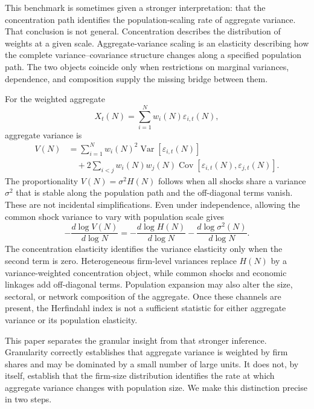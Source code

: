 \documentclass[a4paper,fleqn]{cas-dc}
\begin{document}
This benchmark is sometimes given a stronger interpretation: that the
concentration path identifies the population-scaling rate of aggregate
variance. That conclusion is not general. Concentration describes the
distribution of weights at a given scale. Aggregate-variance scaling
is an elasticity describing how the complete variance--covariance
structure changes along a specified population path. The two objects
coincide only when restrictions on marginal variances, dependence, and
composition supply the missing bridge between them.

For the weighted aggregate
\begin{equation}
    X_t(N)=\sum_{i=1}^{N}w_i(N)\varepsilon_{i,t}(N),
\end{equation}
aggregate variance is
\begin{align}
\label{eq:intro_variance}
    V(N)
    &=
    \sum_{i=1}^{N}w_i(N)^2
    \operatorname{Var}\!\left[\varepsilon_{i,t}(N)\right]
    \nonumber\\
    &\quad+
    2\sum_{i<j}w_i(N)w_j(N)
    \operatorname{Cov}\!\left[
        \varepsilon_{i,t}(N),\varepsilon_{j,t}(N)
    \right].
\end{align}
The proportionality $V(N)=\sigma^2H(N)$ follows when all shocks share a
variance $\sigma^2$ that is stable along the population path and the
off-diagonal terms vanish. These are not incidental simplifications.
Even under independence, allowing the common shock variance to vary with
population scale gives
\begin{equation}
\label{eq:benchmark_elasticity_bridge}
    -\frac{d\log V(N)}{d\log N}
    =
    -\frac{d\log H(N)}{d\log N}
    -\frac{d\log \sigma^2(N)}{d\log N}.
\end{equation}
The concentration elasticity identifies the variance elasticity only
when the second term is zero. Heterogeneous firm-level variances replace
$H(N)$ by a variance-weighted concentration object, while common shocks
and economic linkages add off-diagonal terms. Population expansion may
also alter the size, sectoral, or network composition of the aggregate.
Once these channels are present, the Herfindahl index is not a sufficient
statistic for either aggregate variance or its population elasticity.

This paper separates the granular insight from that stronger inference.
Granularity correctly establishes that aggregate variance is weighted
by firm shares and may be dominated by a small number of large units. It
does not, by itself, establish that the firm-size distribution identifies
the rate at which aggregate variance changes with population size. We
make this distinction precise in two steps.
\end{document}
